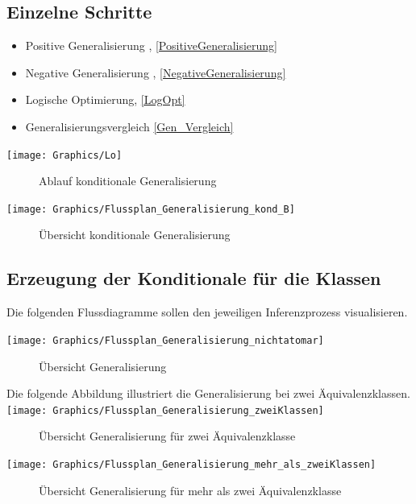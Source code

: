 \documentclass[a4paper, 11pt]{book}
\begin{document}
\subsection{Einzelne Schritte}
\begin{itemize}
	\item Positive Generalisierung , \ref{PositiveGeneralisierung}
	\item Negative Generalisierung , \ref{NegativeGeneralisierung}
	\item Logische Optimierung, \ref{LogOpt}
	\item Generalisierungsvergleich \ref{Gen_Vergleich}
\end{itemize}


\texttt{[image: Graphics/Lo]}
\begin{figure}[h]
	\caption{Ablauf konditionale Generalisierung }
	\label{Abb_Log_Gen}
\end{figure}



\newpage
\texttt{[image: Graphics/Flussplan\_Generalisierung\_kond\_B]}
\begin{figure}[h!]
	\caption{Übersicht konditionale Generalisierung}
	\label{Fig_Log_Genopt}
\end{figure}



\subsection{Erzeugung der Konditionale für die Klassen}
Die folgenden Flussdiagramme sollen den jeweiligen Inferenzprozess visualisieren.

\texttt{[image: Graphics/Flussplan\_Generalisierung\_nichtatomar]}
\begin{figure}[h!]
	\caption{Übersicht Generalisierung}
	\label{Fig_General}
\end{figure}
\newpage
Die folgende Abbildung illustriert die Generalisierung bei zwei Äquivalenzklassen.
\texttt{[image: Graphics/Flussplan\_Generalisierung\_zweiKlassen]}
\begin{figure}[h!]
	\caption{Übersicht Generalisierung für zwei Äquivalenzklasse}
	\label{Fig_ZweiKlassen}
\end{figure}

\texttt{[image: Graphics/Flussplan\_Generalisierung\_mehr\_als\_zweiKlassen]}
\begin{figure}[h]
	\caption{Übersicht Generalisierung für mehr als zwei Äquivalenzklasse}
	\label{Fig_Mehr_Klassen}
\end{figure}
\end{document}

